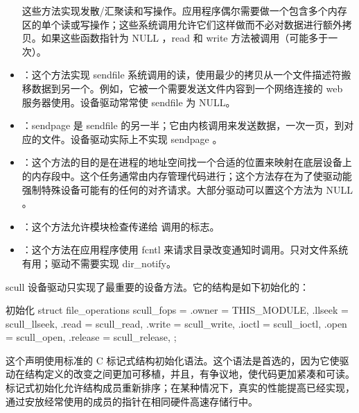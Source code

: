 \documentclass[lang=cn,newtx,10pt,scheme=chinese]{elegantbook}
\begin{document}
\begin{itemize}
这些方法实现发散/汇聚读和写操作。应用程序偶尔需要做一个包含多个内存区的单个读或写操作；这些系统调用允许它们这样做而不必对数据进行额外拷贝。如果这些函数指针为 NULL ，read 和 write 方法被调用（可能多于一次）。
    \item {}：这个方法实现 sendfile 系统调用的读，使用最少的拷贝从一个文件描述符搬移数据到另一个。例如，它被一个需要发送文件内容到一个网络连接的 web 服务器使用。设备驱动常常使 sendfile 为 NULL。
    \item {}：sendpage 是 sendfile 的另一半；它由内核调用来发送数据，一次一页，到对应的文件。设备驱动实际上不实现 sendpage 。
    \item {}：这个方法的目的是在进程的地址空间找一个合适的位置来映射在底层设备上的内存段中。这个任务通常由内存管理代码进行；这个方法存在为了使驱动能强制特殊设备可能有的任何的对齐请求。大部分驱动可以置这个方法为 NULL 。
    \item {}：这个方法允许模块检查传递给  调用的标志。
    \item {}：这个方法在应用程序使用 fcntl 来请求目录改变通知时调用。只对文件系统有用；驱动不需要实现 dir\_notify。
\end{itemize}

scull 设备驱动只实现了最重要的设备方法。它的结构是如下初始化的：

\begin{mycode}{初始化}
  struct file_operations scull_fops = {
    .owner = THIS_MODULE,
    .llseek = scull_llseek,
    .read = scull_read,
    .write = scull_write,
    .ioctl = scull_ioctl,
    .open = scull_open,
    .release = scull_release,
  };
\end{mycode}

这个声明使用标准的 C 标记式结构初始化语法。这个语法是首选的，因为它使驱动在结构定义的改变之间更加可移植，并且，有争议地，使代码更加紧凑和可读。标记式初始化允许结构成员重新排序；在某种情况下，真实的性能提高已经实现，通过安放经常使用的成员的指针在相同硬件高速存储行中。
\end{document}

